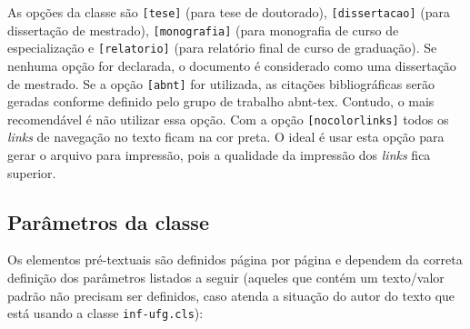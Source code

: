 As opções da classe são \verb|[tese]| (para tese de doutorado), \verb|[dissertacao]| (para dissertação de mestrado), \verb|[monografia]| (para monografia de curso de especialização e \verb|[relatorio]| (para relatório final de curso de graduação). Se nenhuma opção for declarada, o documento é considerado como uma dissertação de mestrado. Se a opção \verb|[abnt]| for utilizada, as citações bibliográficas serão geradas conforme definido pelo grupo de trabalho \textsf{abnt-tex}. Contudo, o mais recomendável é não utilizar essa opção. Com a opção \verb|[nocolorlinks]| todos os {\em links} de navegação no texto ficam na cor preta. O ideal é usar esta opção para gerar o arquivo para impressão, pois a qualidade da impressão dos {\em links} fica superior.


\subsection{Parâmetros da classe}
\label{sec:param}
Os elementos pré-textuais são definidos página por página e dependem da correta definição dos parâmetros listados a seguir (aqueles que contém um texto/valor padrão não precisam ser definidos, caso atenda a situação do autor do texto que está usando a classe \verb|inf-ufg.cls|):

